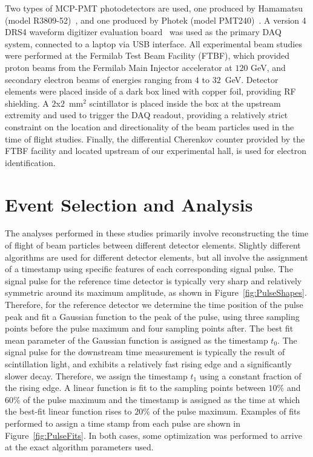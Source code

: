 \documentclass[12pt]{article}
\begin{document}
{Two types of MCP-PMT photodetectors are used, one produced by Hamamatsu (model
R3809-52)~\cite{HamamatsuMCP3809}, and one produced by Photek (model
PMT240)~\cite{Photek240}. A version 4 DRS4 waveform digitizer evaluation
board~\cite{DRS4} was used as the primary DAQ system, connected to a laptop via
USB interface. All experimental beam studies were performed at the Fermilab Test
Beam Facility (FTBF), which provided proton beams from the Fermilab Main
Injector accelerator at $120$ GeV, and secondary electron beams of energies
ranging from $4$ to $32$~GeV. Detector elements were placed inside of a dark box
lined with copper foil, providing RF shielding. A $2$x$2$~$\mathrm{mm}^{2}$
scintillator is placed inside the box at the upstream extremity and used to
trigger the DAQ readout, providing a relatively strict constraint on the
location and directionality of the beam particles used in the time of flight
studies. Finally, the differential Cherenkov counter provided by the FTBF
facility and located upstream of our experimental hall, is used for electron
identification. 

\section{Event Selection and Analysis}

The analyses performed in these studies primarily involve reconstructing the
time of flight of beam particles between different detector elements. Slightly
different algorithms are used for different detector elements, but all involve
the assignment of a timestamp using specific features of each corresponding
signal pulse. The signal pulse for the reference time detector is typically very
sharp and relatively symmetric around its maximum amplitude, as shown in
Figure~\ref{fig:PulseShapes}. Therefore, for the reference detector we determine
the time position of the pulse peak and fit a Gaussian function to the peak of
the pulse, using three sampling points before the pulse maximum and four
sampling points after. The best fit mean parameter of the Gaussian function is
assigned as the timestamp $t_{0}$. The signal pulse for the downstream time
measurement is typically the result of scintillation light, and exhibits a
relatively fast rising edge and a significantly slower decay. Therefore, we
assign the timestamp $t_{1}$ using a constant fraction of the rising edge. A
linear function is fit to the sampling points between $10\%$ and $60\%$ of the
pulse maximum and the timestamp is assigned as the time at which the best-fit
linear function rises to $20\%$ of the pulse maximum. Examples of fits performed
to assign a time stamp from each pulse are shown in Figure~\ref{fig:PulseFits}.
In both cases, some optimization was performed to arrive at the exact algorithm
parameters used.

}
\end{document}

